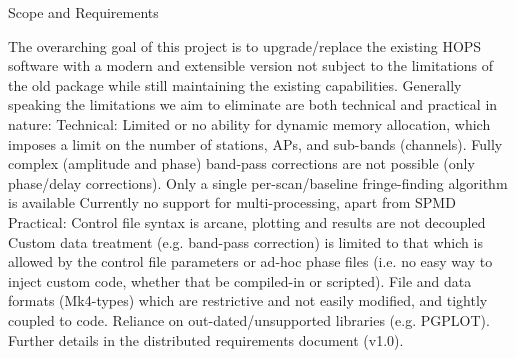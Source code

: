 \documentclass[8pt]{beamer}
\begin{document}
\begin{frame}{Scope and Requirements}


\begin{outline}
    \1 The overarching goal of this project is to upgrade/replace the existing HOPS software with a modern and extensible version not subject to the limitations of the old package while still maintaining the existing capabilities.
    \1 Generally speaking the limitations we aim to eliminate are both technical and
    practical in nature:
        \2 Technical:
            \3 Limited or no ability for dynamic memory allocation, which imposes a limit on the number of stations, APs, and sub-bands (channels).
            \3 Fully complex (amplitude and phase) band-pass corrections are not possible (only phase/delay corrections).
            \3 Only a single per-scan/baseline fringe-finding algorithm is available 
            \3 Currently no support for multi-processing, apart from SPMD
        \2 Practical:
            \3 Control file syntax is arcane, plotting and results are not decoupled
            \3 Custom data treatment (e.g. band-pass correction) is limited to that which is allowed by the control file parameters or ad-hoc phase files (i.e. no easy way to inject custom code, whether that be compiled-in or scripted).
            \3 File and data formats (Mk4-types) which are restrictive and not easily modified, and tightly coupled to code.
            \3 Reliance on out-dated/unsupported libraries (e.g. PGPLOT).
    \1 Further details in the distributed requirements document (v1.0).
\end{outline}

\end{frame}
\end{document}
